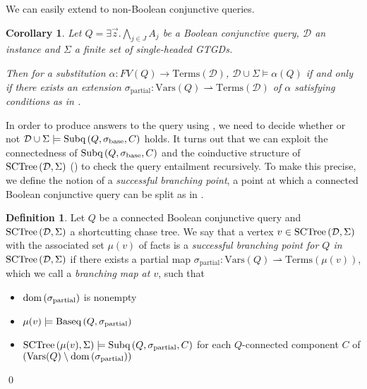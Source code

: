 \documentclass[12pt]{report}
\theoremstyle{plain}
\newtheorem{corollary}[theorem]{Corollary}
\theoremstyle{definition}
\newtheorem{definition}[theorem]{Definition}
\def\Vars{{\mathrm{Vars}}}
\def\Terms{{\mathrm{Terms}}}
\newcommand{\dom}[1]{\ensuremath{\normalfont{\operatorname{dom}} \left( #1 \right)}}
\newcommand{\SCTree}[2]{\ensuremath{\normalfont{\textrm{SCTree}} \left( #1, #2 \right)}}
\newcommand{\Subq}[3]{\ensuremath{\normalfont{\textrm{Subq}} \left( #1, #2, #3 \right)}}
\newcommand{\Baseq}[2]{\ensuremath{\normalfont{\textrm{Baseq}} \left( #1, #2 \right)}}
\begin{document}
We can easily extend  to non-Boolean conjunctive queries.

\begin{corollary}
\label{base-connected-query-decomposition}
  Let $Q = \exists \vec{z}. \bigwedge_{j \in J} A_j$ be a Boolean conjunctive query, $\mathcal{D}$ an instance and $\Sigma$ a finite set of single-headed GTGDs.
  
  Then for a substitution $\alpha: FV(Q) \rightarrow \Terms(\mathcal{D})$, $\mathcal{D} \cup \Sigma \models \alpha(Q)$ if and only if there exists an extension $\sigma_\mathrm{partial}: \Vars(Q) \rightharpoonup \Terms(\mathcal{D})$ of $\alpha$ satisfying conditions as in .
\end{corollary}


In order to produce answers to the query using , we need to decide whether or not $\mathcal{D} \cup \Sigma \models \Subq{Q}{\sigma_\mathrm{base}}{C}$ holds. It turns out that we can exploit the connectedness of $\Subq{Q}{\sigma_\mathrm{base}}{C}$ and the coinductive structure of $\SCTree{\mathcal{D}}{\Sigma}$ () to check the query entailment recursively. To make this precise, we define the notion of a \emph{successful branching point}, a point at which a connected Boolean conjunctive query can be split as in .

\begin{definition}
\label{successful-branching-point-definition}
  Let $Q$ be a connected Boolean conjunctive query and $\SCTree{\mathcal{D}}{\Sigma}$ a shortcutting chase tree. We say that a vertex $v \in \SCTree{\mathcal{D}}{\Sigma}$ with the associated set $\mu(v)$ of facts is a \emph{successful branching point for $Q$ in $\SCTree{\mathcal{D}}{\Sigma}$} if there exists a partial map $\sigma_\mathrm{partial}: \Vars(Q) \rightharpoonup \Terms(\mu(v))$, which we call a \emph{branching map at $v$}, such that
  \begin{itemize}
    \item $\dom{\sigma_\mathrm{partial}}$ is nonempty
    \item $\mu(v) \models \Baseq{Q}{\sigma_\mathrm{partial}}$
    \item $\SCTree{\mu(v)}{\Sigma} \models \Subq{Q}{\sigma_\mathrm{partial}}{C}$ for each $Q$-connected component $C$ of $(\Vars(Q) \setminus \dom{\sigma_\mathrm{partial}})$
  \end{itemize}
  \qed
\end{definition}
\end{document}
